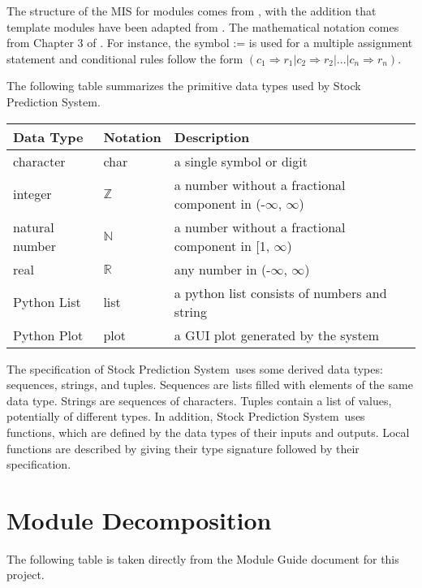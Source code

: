 \documentclass[12pt, titlepage]{article}
\newcommand{\progname}{Stock Prediction System}
\begin{document}
The structure of the MIS for modules comes from \citet{HoffmanAndStrooper1995},
with the addition that template modules have been adapted from
\cite{GhezziEtAl2003}. The mathematical notation comes from Chapter 3 of
\citet{HoffmanAndStrooper1995}. For instance, the symbol := is used for a
multiple assignment statement and conditional rules follow the form $(c_1
\Rightarrow r_1 | c_2 \Rightarrow r_2 | ... | c_n \Rightarrow r_n )$.

The following table summarizes the primitive data types used by \progname. 

\begin{center}
\renewcommand{\arraystretch}{1.2}
\noindent 
\begin{tabular}{l l p{7.5cm}} 
\toprule 
\textbf{Data Type} & \textbf{Notation} & \textbf{Description}\\ 
\midrule
character & char & a single symbol or digit\\
integer & $\mathbb{Z}$ & a number without a fractional component in (-$\infty$, $\infty$) \\
natural number & $\mathbb{N}$ & a number without a fractional component in [1, $\infty$) \\
real & $\mathbb{R}$ & any number in (-$\infty$, $\infty$)\\
Python List &list & a python list consists of numbers and string\\
Python Plot & plot & a GUI plot generated by the system\\
\bottomrule
\end{tabular} 
\end{center}

\noindent
The specification of \progname \ uses some derived data types: sequences, strings, and
tuples. Sequences are lists filled with elements of the same data type. Strings
are sequences of characters. Tuples contain a list of values, potentially of
different types. In addition, \progname \ uses functions, which
are defined by the data types of their inputs and outputs. Local functions are
described by giving their type signature followed by their specification.

\section{Module Decomposition}

The following table is taken directly from the Module Guide document for this project.
\end{document}
